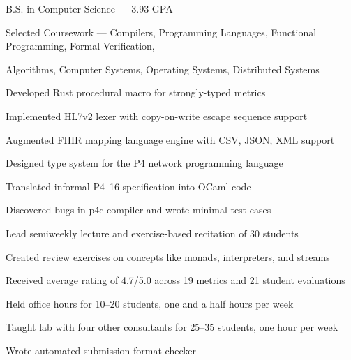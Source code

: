 \documentclass{resume}
\begin{document}
\begin{education}
    \begin{description}
        \item B.S. in Computer Science --- 3.93 GPA
        \item Selected Coursework ---
            Compilers,
            Programming Languages,
            Functional Programming,
            Formal Verification,

            Algorithms,
            Computer Systems,
            Operating Systems,
            Distributed Systems
    \end{description}
\end{education}

\begin{experience}
    \begin{description}
        \item Developed Rust procedural macro for strongly-typed metrics
        \item Implemented HL7v2 lexer with copy-on-write escape sequence support
        \item Augmented FHIR mapping language engine with CSV, JSON, XML support
    \end{description}

    \begin{description}
        \item Designed type system for the P4 network programming language
        \item Translated informal P4--16 specification into OCaml code
        \item Discovered bugs in p4c compiler and wrote minimal test cases
    \end{description}

    \begin{description}
        \item Lead semiweekly lecture and exercise-based recitation of 30 students
        \item Created review exercises on concepts like monads, interpreters, and streams
        \item Received average rating of 4.7/5.0 across 19 metrics and 21 student evaluations
    \end{description}

    \begin{description}
        \item Held office hours for 10--20 students, one and a half hours per week
        \item Taught lab with four other consultants for 25--35 students, one hour per week
        \item Wrote automated submission format checker
    \end{description}
\end{experience}
\end{document}
